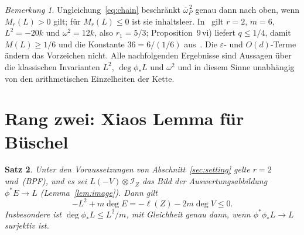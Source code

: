 \documentclass[11pt]{article}
\newtheorem{theorem}{Satz}[section]
\theoremstyle{definition}
\theoremstyle{remark}
\newtheorem{remark}[theorem]{Bemerkung}
\newcommand{\cI}{\mathcal{I}}
\newcommand{\ob}{\overline{\omega}}
\newcommand{\bpf}{\textup{(BPF)}}
\begin{document}
\begin{remark}\label{rem:chain}
Ungleichung~\eqref{eq:chain} beschränkt $\ob_P^{\,2}$ genau dann nach oben, wenn
$M_r(L)>0$ gilt; für $M_r(L)\le 0$ ist sie inhaltsleer. In~\cite{So26} gilt $r=2$,
$m=6$, $L^2=-20k$ und $\omega^2=12k$, also $r_1=5/3$; Proposition~9\,vi) liefert
$q\le 1/4$, damit $M(L)\ge 1/6$ und die Konstante $36=6/(1/6)$
aus~\cite[Theorem~1]{So26}. Die $\varepsilon$- und $O(d)$-Terme ändern das
Vorzeichen nicht. Alle nachfolgenden Ergebnisse sind Aussagen über die
klassischen Invarianten $L^2$, $\deg\phi_*L$ und $\omega^2$ und in diesem Sinne
unabhängig von den arithmetischen Einzelheiten der Kette.
\end{remark}

\section{Rang zwei: Xiaos Lemma für Büschel}\label{sec:rank2}

\begin{theorem}\label{thm:rank2}
Unter den Voraussetzungen von Abschnitt~\ref{sec:setting} gelte $r=2$ und~\bpf,
und es sei $L(-V)\otimes\cI_Z$ das Bild der Auswertungsabbildung $\phi^*E\to L$
(Lemma~\ref{lem:image}). Dann gilt
\begin{equation}\label{eq:rank2}
-L^2+m\deg E=-\ell(Z)-2m\deg V\le 0 .
\end{equation}
Insbesondere ist $\deg\phi_*L\le L^2/m$, mit Gleichheit genau dann, wenn
$\phi^*\phi_*L\to L$ surjektiv ist.
\end{theorem}
\end{document}
